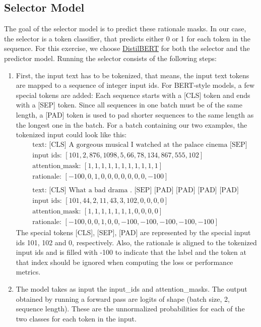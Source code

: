 \documentclass[a4paper]{article}
\begin{document}
\subsection*{Selector Model}
The goal of the selector model is to predict these rationale masks.
In our case, the selector is a token classifier, that predicts either 0 or 1 for each token in the sequence.
For this exercise, we choose \href{https://arxiv.org/abs/1910.01108}{DistilBERT} for both the selector and the predictor model.
Running the selector consists of the following steps:
\begin{enumerate}

    \item First, the input text has to be tokenized, that means, the input text tokens are mapped to a sequence of integer input ids.
    For BERT-style models, a few special tokens are added:
    Each sequence starts with a [CLS] token and ends with a [SEP] token.
    Since all sequences in one batch must be of the same length, a [PAD] token is used to pad shorter sequences to the same length as the longest one in the batch.
    For a batch containing our two examples, the tokenized input could look like this:
    \begin{align*}
    &\text{text: [CLS] A gorgeous musical I watched at the palace cinema [SEP]}\\
    &\text{input ids: }[101, 2, 876, 1098, 5, 66, 78, 134, 867, 555, 102]\\
    &\text{attention\_mask: }[1, 1, 1, 1, 1, 1, 1, 1, 1, 1, 1]\\
    &\text{rationale: }[-100, 0, 1, 0, 0, 0, 0, 0, 0, 0, -100]\\
    \\
    &\text{text: [CLS] What a bad drama . [SEP] [PAD] [PAD] [PAD] [PAD]}\\
    &\text{input ids: }[101, 44, 2, 11, 43, 3, 102, 0, 0, 0, 0]\\
    &\text{attention\_mask: }[1, 1, 1, 1, 1, 1, 1, 0, 0, 0, 0]\\
    &\text{rationale: }[-100, 0, 0, 1, 0, 0, -100, -100, -100, -100, -100]
    \end{align*}
    The special tokens [CLS], [SEP], [PAD] are represented by the special input ids 101, 102 and 0, respectively.
    Also, the rationale is aligned to the tokenized input ids and is filled with -100 to indicate that the label and the token at that index should be ignored when computing the loss or performance metrics.

    \item The model takes as input the input\_ids and attention\_masks.
    The output obtained by running a forward pass are logits of shape (batch size, 2, sequence length).
    These are the unnormalized probabilities for each of the two classes for each token in the input.
    

\end{enumerate}
\end{document}
